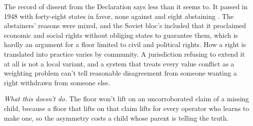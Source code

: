 The record of dissent from the Declaration says less than it seems to. It passed in 1948 with forty-eight states in favor, none against and eight abstaining \autocite{un1948udhr}. The abstainers' reasons were mixed, and the Soviet bloc's included that it proclaimed economic and social rights without obliging states to guarantee them, which is hardly an argument for a floor limited to civil and political rights. How a right is translated into practice varies by community. A jurisdiction refusing to extend it at all is not a local variant, and a system that treats every value conflict as a weighting problem can't tell reasonable disagreement from someone wanting a right withdrawn from someone else.

\emph{What this doesn't do.} The floor won't lift on an uncorroborated claim of a missing child, because a floor that lifts on that claim lifts for every operator who learns to make one, so the asymmetry costs a child whose parent is telling the truth.
